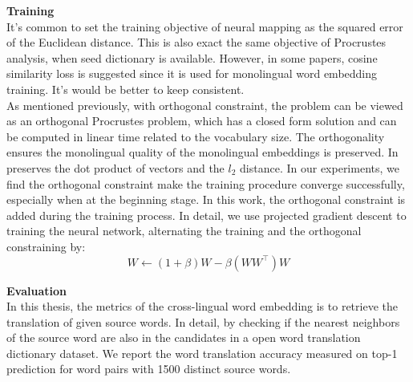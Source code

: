 \textbf{Training}\\
It's common to set the training objective of neural mapping as the squared error of the Euclidean distance. This is also exact the same objective of Procrustes analysis, when seed dictionary is available. However, in some papers, cosine similarity loss is suggested since it is used for monolingual word embedding training. It's would be better to keep consistent.  \\
As mentioned previously, with orthogonal constraint, the problem can be viewed as an orthogonal Procrustes problem, which has a closed form solution and can be computed in linear time related to the vocabulary size. The orthogonality ensures the monolingual quality of the monolingual embeddings is preserved. In preserves the dot product of vectors and the $l_2$ distance.  In our experiments, we find the orthogonal constraint make the training procedure converge successfully, especially when at the beginning stage.
In this work, the orthogonal constraint is added during the training process. In detail, we use projected gradient descent to training the neural network, alternating the training and the orthogonal constraining by:
\[ W \leftarrow (1+\beta) W - \beta(WW^\top)W\]

\textbf{Evaluation}\\
In this thesis, the metrics of the cross-lingual word embedding is to retrieve the translation of given source words. In detail, by checking if the nearest neighbors of the source word are also in the candidates in a open word translation dictionary dataset. We report the word translation accuracy measured on top-1 prediction for word pairs with 1500 distinct source words.\\

